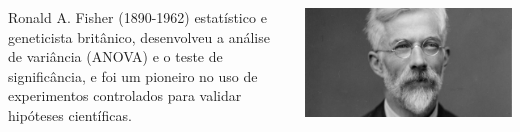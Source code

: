 \documentclass[12pt]{beamer}
\begin{document}
\begin{frame}{}
	\begin{block}{}
		\begin{columns}%
			
			\begin{column}{0.5\textwidth} %
				\vfill
				\centering
				\justifying
				Ronald A. Fisher (1890-1962) estatístico e geneticista britânico, desenvolveu a análise de variância (ANOVA) e o teste de significância, e foi um pioneiro no uso de experimentos controlados para validar hipóteses científicas.
			\end{column}
			
			\begin{column}{0.5\textwidth} %
				\includegraphics[width=\textwidth]{figs/Fisher.jpg} %
			\end{column}
			
		\end{columns}
	\end{block}
\end{frame}
\end{document}
